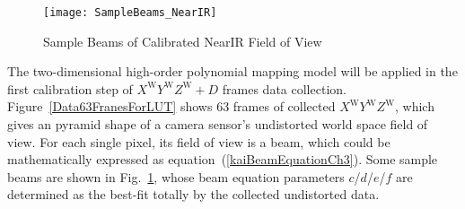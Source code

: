 %
%
\begin{figure}[t]
\centering
\texttt{[image: SampleBeams\_NearIR]}
\caption{Sample Beams of Calibrated NearIR Field of View}
\label{SampleBeams_NearIR}
\end{figure}
%
The two-dimensional high-order polynomial mapping model will be applied in the first calibration step of \(X^\text{W}Y^\text{W}Z^\text{W}+D\) frames data collection. Figure~\ref{Data63FranesForLUT} shows 63 frames of collected \(X^\text{W}Y^\text{W}Z^\text{W}\), which gives an pyramid shape of a camera sensor's undistorted world space field of view. For each single pixel, its field of view is a beam, which could be mathematically expressed as equation~(\ref{kaiBeamEquationCh3}). Some sample beams are shown in Fig.~\ref{SampleBeams_NearIR}, whose beam equation parameters \(c\)/\(d\)/\(e\)/\(f\) are determined as the best-fit totally by the collected undistorted data. 

\clearpage

